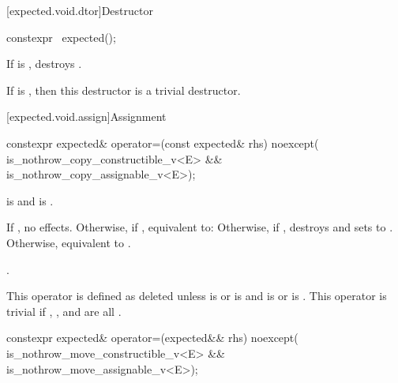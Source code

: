 [expected.void.dtor]{Destructor}

%
\begin{itemdecl}
constexpr ~expected();
\end{itemdecl}

\begin{itemdescr}
\pnum
\effects
If  is , destroys .

\pnum
\remarks
If  is , then this destructor is a trivial destructor.
\end{itemdescr}

[expected.void.assign]{Assignment}

%
\begin{itemdecl}
constexpr expected& operator=(const expected& rhs) noexcept(
    is_nothrow_copy_constructible_v<E> && is_nothrow_copy_assignable_v<E>);
\end{itemdecl}

\begin{itemdescr}
\pnum
\constraints
{} is  and  is .

\pnum
\effects
If , no effects. Otherwise, if , equivalent to:  Otherwise, if , destroys  and sets  to . Otherwise, equivalent to .

\pnum
\returns
{}.

\pnum
\remarks
This operator is defined as deleted unless  is  or  is  and  is  or  is . This operator is trivial if , , and  are all .
\end{itemdescr}

%
\begin{itemdecl}
constexpr expected& operator=(expected&& rhs) noexcept(
    is_nothrow_move_constructible_v<E> && is_nothrow_move_assignable_v<E>);
\end{itemdecl}


